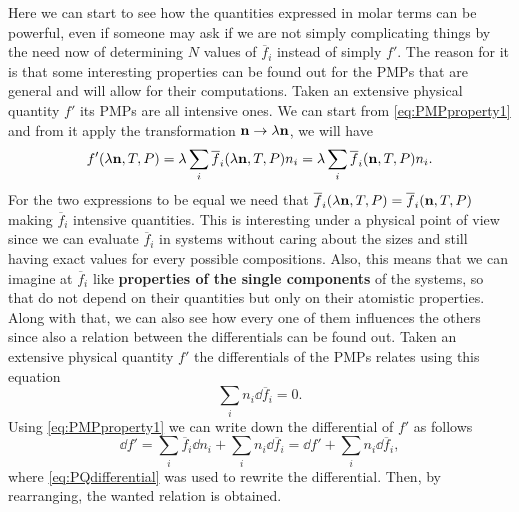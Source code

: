 Here we can start to see how the quantities expressed in molar terms can be powerful, even if someone may ask if we are not simply complicating things by the need now of determining $N$ values of $\overline{f}_i$ instead of simply $f'$. The reason for it is that some interesting properties can be found out for the PMPs that are general and will allow for their computations.
{
    Taken an extensive physical quantity $f'$ its PMPs are all intensive ones.
}
{
    We can start from \eqref{eq:PMPproperty1} and from it apply the transformation $\vb{n} \to \lambda \vb{n}$, we will have
    \begin{equation}
        f'(\lambda\vb{n}, T, P) = \lambda\sum_i \overline{f}_i(\lambda\vb{n}, T, P)n_i = \lambda\sum_i \overline{f}_i(\vb{n}, T, P) n_i.
    \end{equation}
    For the two expressions to be equal we need that $\overline{f}_i(\lambda\vb{n}, T, P) = \overline{f}_i(\vb{n}, T, P)$ making $\overline{f}_i$ intensive quantities.
}
\noindent
This is interesting under a physical point of view since we can evaluate $\overline{f}_i$ in systems without caring about the sizes and still having exact values for every possible compositions. Also, this means that we can imagine at $\overline{f}_i$ like \textbf{properties of the single components} of the systems, so that do not depend on their quantities but only on their atomistic properties. Along with that, we can also see how every one of them influences the others since also a relation between the differentials can be found out.
{
    Taken an extensive physical quantity $f'$ the differentials of the PMPs relates using this equation
    \begin{equation}
        \sum_i n_i \dd \overline{f}_i = 0.
    \end{equation}
}
{
    Using \eqref{eq:PMPproperty1} we can write down the differential of $f'$ as follows
    \begin{equation}
        \dd f' = \sum_i \overline{f}_i \dd n_i + \sum_i n_i \dd \overline{f}_i = \dd f' + \sum_i n_i \dd \overline{f}_i,
    \end{equation}
    where \eqref{eq:PQdifferential} was used to rewrite the differential. Then, by rearranging, the wanted relation is obtained.
}

